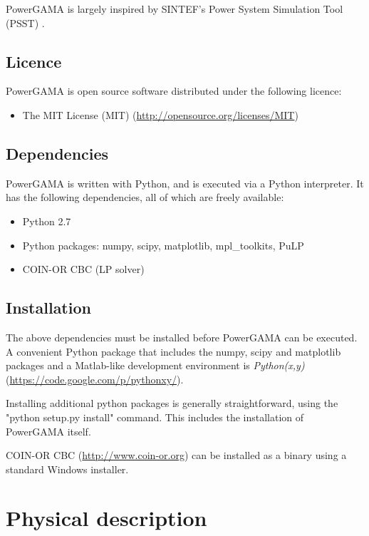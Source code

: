 \documentclass{article}
\begin{document}
PowerGAMA is largely inspired by SINTEF's Power System Simulation Tool (PSST) 
\cite{korpas2007,hueartas2010}.



\subsection{Licence}
PowerGAMA is open source software distributed under the following licence:
\begin{itemize}
\item The MIT License (MIT) (\url{http://opensource.org/licenses/MIT})
\end{itemize}

\subsection{Dependencies}
PowerGAMA is written with Python, and is executed via a Python interpreter.
It has the following dependencies, all of which are freely available:

\begin{itemize}
\item Python 2.7
\item Python packages: numpy, scipy, matplotlib, mpl\_toolkits, PuLP
\item COIN-OR CBC (LP solver)
\end{itemize}

\subsection{Installation}

The above dependencies must be installed before PowerGAMA can be executed. A convenient Python package that includes the numpy, scipy and matplotlib packages and a Matlab-like development environment is \emph{Python(x,y)} (\url{https://code.google.com/p/pythonxy/}).

Installing additional python packages is generally straightforward, using the "python setup.py install" command. This includes the installation of PowerGAMA itself.

COIN-OR CBC (\url{http://www.coin-or.org}) can be installed as a binary using a standard Windows installer.




\section{Physical description}
\end{document}

